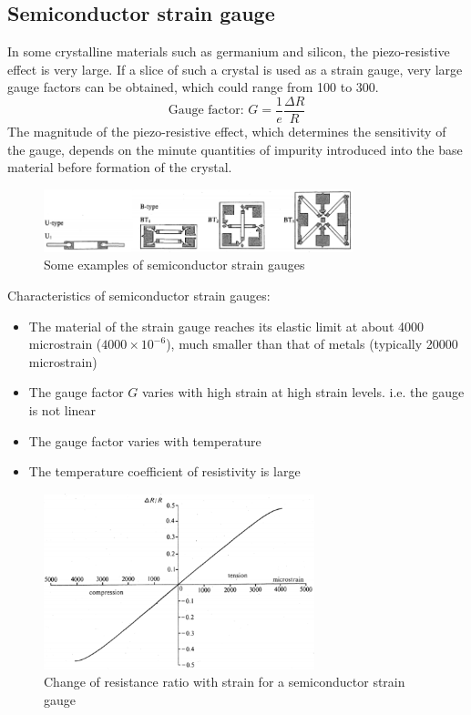 \documentclass[class=report, crop=false, 12pt,a4paper]{standalone}
\begin{document}
\subsection{Semiconductor strain gauge}
In some crystalline materials such as germanium and silicon, the piezo-resistive effect is very large. If a slice of such a crystal is used as a strain gauge, very large gauge factors can be obtained, which could range from 100 to 300. 
\begin{equation}
  \textrm{Gauge factor: }G = \frac{1}{e}\frac{\Delta R}{R}
\end{equation}
The magnitude of the piezo-resistive effect, which determines the sensitivity of the gauge, depends on the minute quantities of impurity introduced into the base material before formation of the crystal.
\begin{figure}[H]
  \centering
  \includegraphics[width = 0.8\textwidth]{../img/diagram19.png}
  \caption{Some examples of semiconductor strain gauges}
\end{figure}
Characteristics of semiconductor strain gauges:
\begin{itemize}
  \item The material of the strain gauge reaches its elastic limit at about 4000 microstrain ($4000\times 10^{-6}$), much smaller than that of metals (typically 20000 microstrain)
  \item The gauge factor $G$ varies with high strain at high strain levels. i.e. the gauge is not linear
  \item The gauge factor varies with temperature
  \item The temperature coefficient of resistivity is large
\end{itemize}
\begin{figure}[H]
  \centering
  \includegraphics[width = 0.7\textwidth]{../img/diagram20.png}
  \caption{Change of resistance ratio with strain for a semiconductor strain gauge}
\end{figure}
\end{document}

